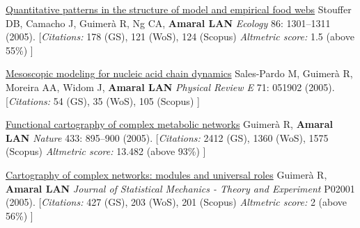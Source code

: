 \NumberedItem{\makebox[0.8cm][r]{[62]}}
\href{/people/amaral/quantitative-patterns-in-the-structure-of-model-and-empirical-food-webs}
{Quantitative patterns in the structure of model and empirical food webs}
\newline
Stouffer DB, Camacho J, Guimer\`a R, Ng CA, {\textbf{Amaral LAN}}
\newline
\textit{Ecology}
    86:
1301--1311 (2005).
    \newline
    \hfill [{\em{Citations:}} 178 (GS),
    121 (WoS), 124 (Scopus)
        {\hspace*{1cm} \em{Altmetric score:}}  1.5 (above 55\%)
    ]
\newline
\Gap
~
\Gap

\NumberedItem{\makebox[0.8cm][r]{[61]}}
\href{/people/amaral/mesoscopic-modeling-for-nucleic-acid-chain-dynamics}
{Mesoscopic modeling for nucleic acid chain dynamics}
\newline
Sales-Pardo M, Guimer\`a R, Moreira AA, Widom J, {\textbf{Amaral LAN}}
\newline
\textit{Physical Review E}
    71:
051902 (2005).
    \newline
    \hfill [{\em{Citations:}} 54 (GS),
    35 (WoS), 105 (Scopus)
    ]
\newline
\Gap
~
\Gap

\NumberedItem{\makebox[0.8cm][r]{[60]}}
\href{/people/amaral/functional-cartography-of-complex-metabolic-networks}
{Functional cartography of complex metabolic networks}
\newline
Guimer\`a R, {\textbf{Amaral LAN}}
\newline
\textit{Nature}
    433:
895--900 (2005).
    \newline
    \hfill [{\em{Citations:}} 2412 (GS),
    1360 (WoS), 1575 (Scopus)
        {\hspace*{1cm} \em{Altmetric score:}}  13.482 (above 93\%)
    ]
\newline
\Gap
~
\Gap

\NumberedItem{\makebox[0.8cm][r]{[59]}}
\href{/people/amaral/cartography-of-complex-networks-modules-and-universal-roles}
{Cartography of complex networks: modules and universal roles}
\newline
Guimer\`a R, {\textbf{Amaral LAN}}
\newline
\textit{Journal of Statistical Mechanics - Theory and Experiment}
P02001 (2005).
    \newline
    \hfill [{\em{Citations:}} 427 (GS),
    203 (WoS), 201 (Scopus)
        {\hspace*{1cm} \em{Altmetric score:}}  2 (above 56\%)
    ]
\newline
\Gap
~
\Gap

